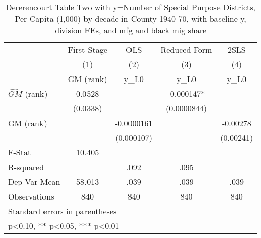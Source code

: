 \begin{table}[htbp]\centering
\def\sym#1{\ifmmode^{#1}\else\(^{#1}\)\fi}
\caption{Dererencourt Table Two with y=Number of Special Purpose Districts, Per Capita (1,000) by decade in County 1940-70, with baseline y, division FEs, and mfg and black mig share}
\begin{tabular}{l*{4}{c}}
\toprule
                    & First Stage   &         OLS   &Reduced Form   &        2SLS   \\
                    &\multicolumn{1}{c}{(1)}&\multicolumn{1}{c}{(2)}&\multicolumn{1}{c}{(3)}&\multicolumn{1}{c}{(4)}\\
                    &\multicolumn{1}{c}{GM  (rank)}&\multicolumn{1}{c}{y\_L0}&\multicolumn{1}{c}{y\_L0}&\multicolumn{1}{c}{y\_L0}\\
\midrule
$\hat{GM}$ (rank)   &      0.0528   &               &   -0.000147*  &               \\
                    &    (0.0338)   &               & (0.0000844)   &               \\
\addlinespace
GM  (rank)          &               &  -0.0000161   &               &    -0.00278   \\
                    &               &  (0.000107)   &               &   (0.00241)   \\
\midrule
F-Stat              &      10.405   &               &               &               \\
R-squared           &               &        .092   &        .095   &               \\
Dep Var Mean        &      58.013   &        .039   &        .039   &        .039   \\
Observations        &         840   &         840   &         840   &         840   \\
\bottomrule
\multicolumn{5}{l}{\footnotesize Standard errors in parentheses}\\
\multicolumn{5}{l}{\footnotesize * p<0.10, ** p<0.05, *** p<0.01}\\
\end{tabular}
\end{table}
